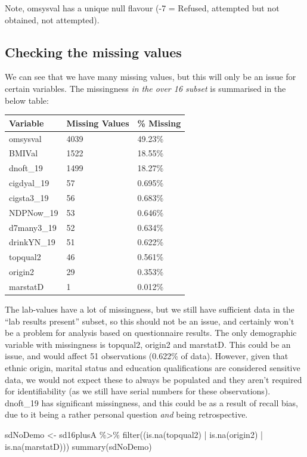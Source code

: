 \documentclass[
  11pt,
]{article}
\newenvironment{Shaded}{\begin{snugshade}}{\end{snugshade}}
\newcommand{\FunctionTok}[1]{\textcolor[rgb]{0.00,0.00,0.00}{#1}}
\newcommand{\NormalTok}[1]{#1}
\newcommand{\OtherTok}[1]{\textcolor[rgb]{0.56,0.35,0.01}{#1}}
\newcommand{\SpecialCharTok}[1]{\textcolor[rgb]{0.00,0.00,0.00}{#1}}
\begin{document}
Note, omsysval has a unique null flavour (-7 = Refused, attempted but
not obtained, not attempted).

\hypertarget{checking-the-missing-values}{%
\subsection{Checking the missing
values}\label{checking-the-missing-values}}

We can see that we have many missing values, but this will only be an
issue for certain variables. The missingness \emph{in the over 16
subset} is summarised in the below table:

\begin{longtable}[]{@{}lll@{}}
\toprule()
Variable & Missing Values & \% Missing \\
\midrule()
\endhead
omsysval & 4039 & 49.23\% \\
BMIVal & 1522 & 18.55\% \\
dnoft\_19 & 1499 & 18.27\% \\
cigdyal\_19 & 57 & 0.695\% \\
cigsta3\_19 & 56 & 0.683\% \\
NDPNow\_19 & 53 & 0.646\% \\
d7many3\_19 & 52 & 0.634\% \\
drinkYN\_19 & 51 & 0.622\% \\
topqual2 & 46 & 0.561\% \\
origin2 & 29 & 0.353\% \\
marstatD & 1 & 0.012\% \\
\bottomrule()
\end{longtable}

The lab-values have a lot of missingness, but we still have sufficient
data in the ``lab results present'' subset, so this should not be an
issue, and certainly won't be a problem for analysis based on
questionnaire results. The only demographic variable with missingness is
topqual2, origin2 and marstatD. This could be an issue, and would affect
51 observations (0.622\% of data). However, given that ethnic origin,
marital status and education qualifications are considered sensitive
data, we would not expect these to always be populated and they aren't
required for identifiability (as we still have serial numbers for these
observations). dnoft\_19 has significant missingness, and this could be
as a result of recall bias, due to it being a rather personal question
\emph{and} being retrospective.

\begin{Shaded}
\begin{Highlighting}[]
\NormalTok{sdNoDemo }\OtherTok{\textless{}{-}}\NormalTok{ sd16plusA }\SpecialCharTok{\%\textgreater{}\%}
  \FunctionTok{filter}\NormalTok{((}\FunctionTok{is.na}\NormalTok{(topqual2) }\SpecialCharTok{|} \FunctionTok{is.na}\NormalTok{(origin2) }\SpecialCharTok{|} \FunctionTok{is.na}\NormalTok{(marstatD)))}
\FunctionTok{summary}\NormalTok{(sdNoDemo)}
\end{Highlighting}
\end{Shaded}
\end{document}
